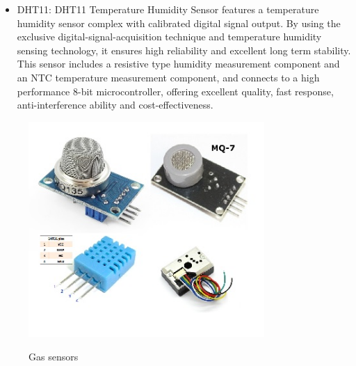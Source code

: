 \begin{enumerate}
\begin{itemize}
		\item DHT11: DHT11 Temperature Humidity Sensor features a temperature humidity sensor complex with calibrated digital signal output. By using the exclusive digital-signal-acquisition technique and temperature humidity sensing technology, it ensures high reliability and excellent long term stability. This sensor includes a resistive type humidity measurement component and an NTC temperature measurement component, and connects to a high performance 8-bit microcontroller, offering excellent quality, fast response, anti-interference ability and cost-effectiveness.
	\end{itemize}
	
	\begin{figure}
	\centering
	\includegraphics[width=0.8\textwidth]{./sensor}\\[0.1in]
	\caption{Gas sensors}
	\label{fig:Gas sensors}
	\end{figure}

	


\end{enumerate}
